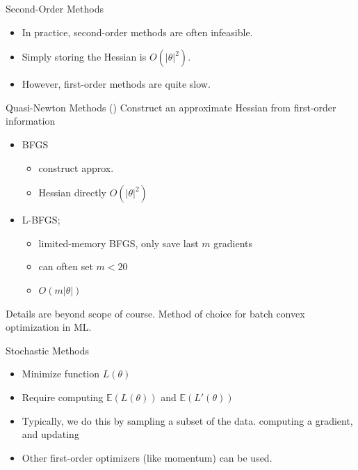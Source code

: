 \documentclass{beamer}
\begin{document}
\begin{frame}{Second-Order Methods}
  \begin{itemize}
  \item In practice, second-order methods are often infeasible.
  \item Simply storing the Hessian is $O(|\theta|^2)$.
  \item However, first-order methods are quite slow.
  \end{itemize}
\end{frame}


\begin{frame}{Quasi-Newton Methods () }
  Construct an approximate Hessian from 
  first-order information
  \begin{itemize}
  \item BFGS 
    \begin{itemize}
    \item construct approx. 
    \item Hessian directly $O(|\theta|^2)$
    \end{itemize}

  \item L-BFGS; 
    \begin{itemize}
    \item limited-memory BFGS, only save last $m$ gradients
    \item can often set $m <20$
    \item $O(m|\theta|)$
    \end{itemize}
  \end{itemize}
  
  Details are beyond scope of course. Method of choice for batch convex
  optimization in ML.

\end{frame}

\begin{frame}{Stochastic Methods}
  \begin{itemize}
  \item Minimize function $L(\theta)$
  \item Require computing $\mathbb{E}(L(\theta))$ and $\mathbb{E}(L'(\theta))$
  \end{itemize}

  \begin{itemize}
  \item Typically, we do this by sampling a subset of the data.
    computing a gradient, and updating
  \item Other first-order optimizers (like momentum) can be used.
  \end{itemize}
\end{frame}
\end{document}

